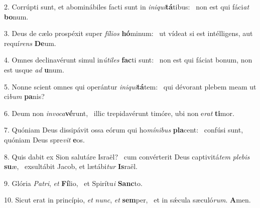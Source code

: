 2. Corrúpti sunt, et abominábiles facti sunt in \textit{in}\textit{i}\textit{qui}\textbf{tá}tibus: \ast\  non est qui fáci\textit{at} \textbf{bo}num.\

3. Deus de cælo prospéxit super \textit{fí}\textit{li}\textit{os} \textbf{hó}minum: \ast\  ut vídeat si est intélligens, aut requí\textit{rens} \textbf{De}um.\

4. Omnes declinavérunt simul in\textit{ú}\textit{ti}\textit{les} \textbf{fac}ti sunt: \ast\  non est qui fáciat bonum, non est usque \textit{ad} \textbf{u}num.\

5. Nonne scient omnes qui operántur \textit{in}\textit{i}\textit{qui}\textbf{tá}tem: \ast\  qui dévorant plebem meam ut ci\textit{bum} \textbf{pa}nis?\

6. Deum non \textit{in}\textit{vo}\textit{ca}\textbf{vé}runt, \ast\  illic trepidavérunt timóre, ubi non e\textit{rat} \textbf{ti}mor.\

7. Quóniam Deus dissipávit ossa eórum qui ho\textit{mí}\textit{ni}\textit{bus} \textbf{pla}cent: \ast\  confúsi sunt, quóniam Deus spre\textit{vit} \textbf{e}os.\

8. Quis dabit ex Sion salutáre Israël? \dag\  cum convérterit Deus captivitá\textit{tem} \textit{ple}\textit{bis} \textbf{su}æ, \ast\  exsultábit Jacob, et lætábi\textit{tur} \textbf{Is}raël.\

9. Glória \textit{Pa}\textit{tri}, \textit{et} \textbf{Fí}lio, \ast\  et Spirítu\textit{i} \textbf{Sanc}to.\

10. Sicut erat in princípio, \textit{et} \textit{nunc}, \textit{et} \textbf{sem}per, \ast\  et in sǽcula sæculó\textit{rum}. \textbf{A}men.\

